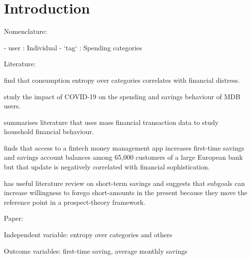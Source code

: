 
\section{Introduction}%
\label{sec:introduction}

Nomenclature:

- user          : Individual
- `tag`         : Spending categories



Literature:

\citet{muggleton2020evidence} find that consumption entropy over categories
correlates with financial distress.

\citet{davenport2020spending} study the impact of COVID-19 on the spending and
savings behaviour of MDB users.

\citet{baker2021household} summarises literature that uses mass financial
transaction data to study household financial behaviour.

\citet{becker2017does} finds that access to a fintech money management app
increases first-time savings and savings account balances among 65,000 customers
of a large European bank but that update is negatively correlated with financial
sophistication.

\citet{colby2013savings} has useful literature review on short-term savings and
suggests that subgoals can increase willingness to forego short-amounts in the
present because they move the reference point in a prospect-theory framework.

Paper:

Independent variable: entropy over categories and others

Outcome variables: first-time saving, average monthly savings
